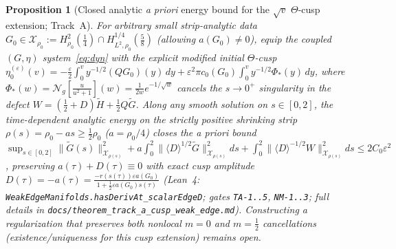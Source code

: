 \documentclass[11pt,a4paper]{article}
\newtheorem{prop}{Proposition}[section]
\begin{document}
\begin{prop}[Closed analytic \emph{a priori} energy bound for the $\sqrt{v}$ $\Theta$-cusp extension; Track~A]\label{prop:track_a}
For arbitrary small strip-analytic data $G_0\in\mathcal{X}_{\rho_0}:=H^2_{\rho_0}(\tfrac14)\cap H^{1/4}_{L^2,\rho_0}(\tfrac58)$
(allowing $a(G_0)\ne 0$), equip the coupled $(G,\eta)$ system~\eqref{eq:dyn} with the explicit modified
initial $\Theta$-cusp
$\eta_0^{(\varepsilon)}(v)=-\frac{\varepsilon}{2}\int_0^v y^{-1/2}(QG_0)(y)\,dy+\varepsilon^2\pi c_0(G_0)\int_0^v y^{-1/2}\Phi_*(y)\,dy$,
where $\Phi_*(w)=\mathcal{N}_g[\frac{u}{u^2+1}](w)=\frac{1}{2w}e^{-1/\sqrt{w}}$ cancels the $s\to 0^+$
singularity in the defect $W=(\tfrac12+D)\widetilde H+\tfrac12 Q\widetilde G$.
Along any smooth solution on $s\in[0,2]$, the time-dependent analytic energy on the strictly positive
shrinking strip $\rho(s)=\rho_0-a s\ge\tfrac12\rho_0$ ($a=\rho_0/4$) closes the \emph{a priori} bound
$\sup_{s\in[0,2]}\|\widetilde G(s)\|_{\mathcal{X}_{\rho(s)}}^2+a\int_0^2\|\langle D\rangle^{1/2}\widetilde G\|_{\mathcal{X}_{\rho(s)}}^2 ds+\int_0^2\|\langle D\rangle^{-1/2}W\|_{\mathcal{X}_{\rho(s)}}^2 ds\le 2C_0\varepsilon^2$,
preserving $a(\tau)+D(\tau)\equiv 0$ with exact cusp amplitude
$D(\tau)=-a(\tau)=\frac{-r(s(\tau))\varepsilon a(G_0)}{1+\frac12\varepsilon a(G_0)s(\tau)}$
(Lean~4: \texttt{WeakEdgeManifolds.hasDerivAt\_scalarEdgeD}; gates \texttt{TA-1..5}, \texttt{NM-1..3};
full details in \texttt{docs/theorem\_track\_a\_cusp\_weak\_edge.md}).
Constructing a regularization that preserves both nonlocal $m=0$ and $m=\tfrac12$ cancellations
(existence/uniqueness for this cusp extension) remains open.
\end{prop}
\end{document}
